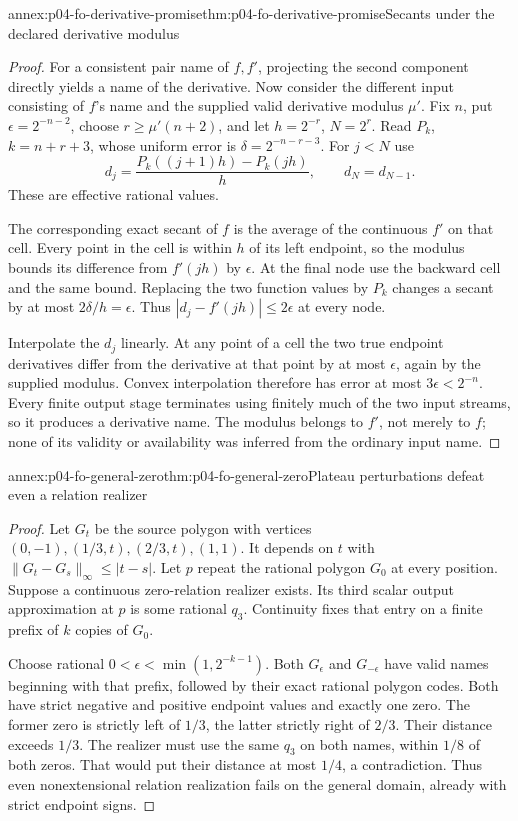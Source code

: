 \begin{annexitem}{annex:p04-fo-derivative-promise}{thm:p04-fo-derivative-promise}{Secants under the declared derivative modulus}
\begin{proof}
For a consistent pair name of \(f,f'\), projecting the second
component directly yields a name of the derivative.
Now consider the different input consisting of \(f\)'s name
and the supplied valid derivative modulus \(\mu'\).
Fix \(n\), put \(\epsilon=2^{-n-2}\), choose
\(r\geq\mu'(n+2)\), and let \(h=2^{-r}\), \(N=2^r\).
Read \(P_k\), \(k=n+r+3\), whose uniform error is
\(\delta=2^{-n-r-3}\).
For \(j<N\) use
\[
 d_j=\frac{P_k((j+1)h)-P_k(jh)}h,
 \qquad d_N=d_{N-1}.
\]
These are effective rational values.

The corresponding exact secant of \(f\) is the average of
the continuous \(f'\) on that cell. Every point in the cell
is within \(h\) of its left endpoint, so the modulus bounds
its difference from \(f'(jh)\) by \(\epsilon\).
At the final node use the backward cell and the same bound.
Replacing the two function values by \(P_k\) changes a
secant by at most \(2\delta/h=\epsilon\).
Thus \(|d_j-f'(jh)|\leq2\epsilon\) at every node.

Interpolate the \(d_j\) linearly. At any point of a cell
the two true endpoint derivatives differ from the derivative
at that point by at most \(\epsilon\), again by the supplied
modulus. Convex interpolation therefore has error at most
\(3\epsilon<2^{-n}\).
Every finite output stage terminates using finitely much of
the two input streams, so it produces a derivative name.
The modulus belongs to \(f'\), not merely to \(f\);
none of its validity or availability was inferred from the
ordinary input name.
\end{proof}
\end{annexitem}

\begin{annexitem}{annex:p04-fo-general-zero}{thm:p04-fo-general-zero}{Plateau perturbations defeat even a relation realizer}
\begin{proof}
Let \(G_t\) be the source polygon with vertices
\((0,-1),(1/3,t),(2/3,t),(1,1)\).
It depends on \(t\) with
\(\lVert G_t-G_s\rVert_\infty\leq|t-s|\).
Let \(p\) repeat the rational polygon \(G_0\) at every position.
Suppose a continuous zero-relation realizer exists.
Its third scalar output approximation at \(p\) is some rational
\(q_3\). Continuity fixes that entry on a finite prefix of
\(k\) copies of \(G_0\).

Choose rational \(0<\epsilon<\min(1,2^{-k-1})\).
Both \(G_\epsilon\) and \(G_{-\epsilon}\) have valid names
beginning with that prefix, followed by their exact rational
polygon codes. Both have strict negative and positive
endpoint values and exactly one zero.
The former zero is strictly left of \(1/3\), the latter
strictly right of \(2/3\). Their distance exceeds \(1/3\).
The realizer must use the same \(q_3\) on both names,
within \(1/8\) of both zeros. That would put their distance
at most \(1/4\), a contradiction.
Thus even nonextensional relation realization fails on the
general domain, already with strict endpoint signs.
\end{proof}
\end{annexitem}

